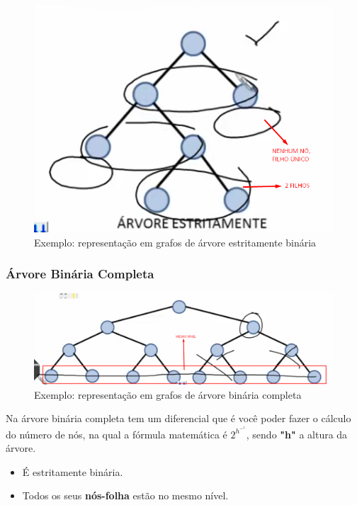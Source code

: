 \documentclass[
	12pt,				%
	oneside,   	        %
	a4paper,			%
	chapter=TITLE,		%
	section=TITLE,		%
	subsection=TITLE,	%
	subsubsection=TITLE,%
	english,			%
	french,				%
	spanish,			%
	brazil,				%
	]{pacotes/abntex2}
\begin{document}
\begin{figure}[H]
 \centering
     \includegraphics[scale=0.8]{Figuras/fig-estrita.png}
     \caption{Exemplo: representação em grafos de árvore estritamente binária \cite{imagem5}}
    \label{fig:estritamente-binária}
 \end{figure}

\subsubsection{\textbf{Árvore Binária Completa}}
\label{subsubsec:binária-completa}

\begin{figure}[H]
 \centering
     \includegraphics[scale=0.4]{Figuras/fig-quase.png}
     \caption{Exemplo: representação em grafos de árvore binária completa \cite{imagem6}}
    \label{fig:binaria-completa}
 \end{figure}

Na árvore binária completa tem um diferencial que é você poder fazer o cálculo do número de nós, na qual a fórmula matemática é $2^h^-^1$, sendo \textbf{"h"} a altura da árvore.

\begin{itemize}
    \item É estritamente binária.
    \item Todos os seus \textbf{nós-folha} estão no mesmo nível.
\end{itemize}
\end{document}
